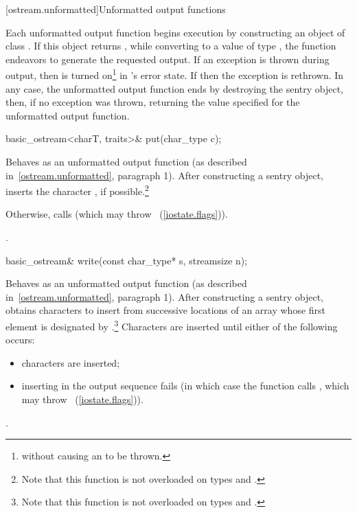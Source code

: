 [ostream.unformatted]{Unformatted output functions}

\pnum
Each
unformatted
output function begins execution by constructing an object of class
.
If this object returns
,
while converting to a value of type
,
the function endeavors
to generate the requested output.
If an exception is thrown during output, then
is turned on\footnote{without causing an
to be thrown.}
in
's
error state.
If
then the exception is rethrown.
In any case, the unformatted output function ends by destroying the
sentry object, then, if no exception was thrown, returning the value
specified for the unformatted output function.

%
\begin{itemdecl}
basic_ostream<charT, traits>& put(char_type c);
\end{itemdecl}

\begin{itemdescr}
\pnum
\effects
Behaves as an unformatted output function (as described in~\ref{ostream.unformatted}, paragraph 1).
After constructing a sentry
object, inserts
the character , if possible.\footnote{Note that this function is not overloaded on types
and
.}

\pnum
Otherwise, calls
(which may throw
~(\ref{iostate.flags})).

\pnum
\returns
{}.
\end{itemdescr}

%
\begin{itemdecl}
basic_ostream& write(const char_type* s, streamsize n);
\end{itemdecl}

\begin{itemdescr}
\pnum
\effects
Behaves as an unformatted output function (as described in~\ref{ostream.unformatted}, paragraph 1).  After constructing a sentry
object, obtains
characters to insert from
successive locations of an array whose first element is designated by
.\footnote{Note that this function is not overloaded on types
and
.}
Characters are inserted until either of the following occurs:
\begin{itemize}
\item
{} characters are inserted;
\item
inserting in the output sequence fails
(in which case the function calls
,
which may throw
~(\ref{iostate.flags})).
\end{itemize}

\pnum
\returns
{}.
\end{itemdescr}

